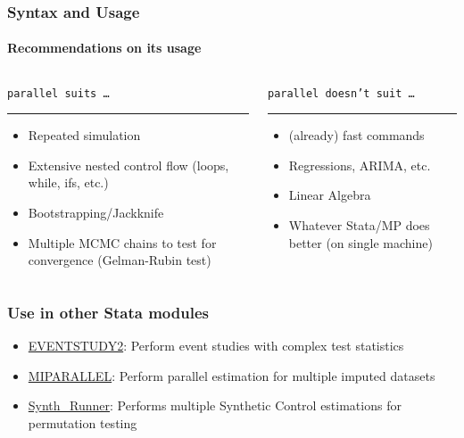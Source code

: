\documentclass[9pt,\ExtraDocOpts]{beamer}
\begin{document}
\begin{frame}
\frametitle{Syntax and Usage}
\framesubtitle{Recommendations on its usage}

\begin{columns}
\begin{column}{.5\textwidth}
{\color{gray}
{\tt parallel suits \ldots}
\rule{\linewidth}{4pt}}
\begin{itemize}
\item Repeated simulation\pause{}
\item Extensive nested control flow (loops, while, ifs, etc.)\pause{}
\item Bootstrapping/Jackknife\pause{}
\item Multiple MCMC chains to test for convergence (Gelman-Rubin test)\pause{}
\end{itemize}
\end{column}%
\hfill%
\begin{column}{.5\textwidth}
{\color{gray}
{\tt parallel doesn't suit \ldots}
\rule{\linewidth}{4pt}}
\begin{itemize}
\item (already) fast commands\pause{}
\item Regressions, ARIMA, etc.\pause{}
\item Linear Algebra\pause{}
\item Whatever Stata/MP does better (on single machine)
\end{itemize}
\end{column}%
\end{columns}
\end{frame}


\begin{frame}
\frametitle{Use in other Stata modules}

\begin{itemize}
\item \href{https://ideas.repec.org/c/boc/bocode/s458086.html}{EVENTSTUDY2}: Perform event studies with complex test statistics 
\item \href{https://ideas.repec.org/c/boc/bocode/s457822.html}{MIPARALLEL}: Perform parallel estimation for multiple imputed datasets 
\item \href{https://github.com/bquistorff/synth_runner}{Synth\_Runner}: Performs multiple Synthetic Control estimations for permutation testing 

\end{itemize}

\end{frame}
\end{document}
